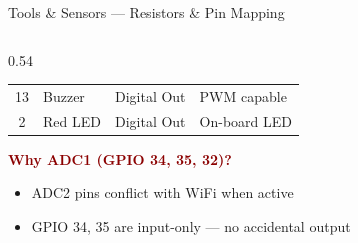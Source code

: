 \documentclass[aspectratio=169, 10pt]{beamer}
\begin{document}
\begin{frame}[shrink=3]{Tools \& Sensors --- Resistors \& Pin Mapping}
\begin{columns}[T]
\begin{column}{0.54\textwidth}
{\begin{tabular}{@{}clll@{}}
        13 & Buzzer         & Digital Out & PWM capable \\
        2  & Red LED        & Digital Out & On-board LED \\
        \bottomrule
      \end{tabular}
      }
      \vspace{0.3em}
      \textbf{\textcolor{darkred}{Why ADC1 (GPIO 34, 35, 32)?}}
      \begin{itemize}\setlength\itemsep{0.2em}
        \item ADC2 pins conflict with WiFi when active
        \item GPIO 34, 35 are input-only --- no accidental output
      \end{itemize}
    \end{column}
  \end{columns}
\end{frame}
\end{document}
